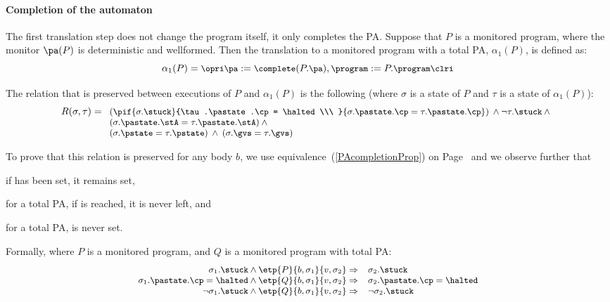 \paragraph{Completion of the automaton}
The first translation step does not change the program itself, it only
completes the PA. Suppose that \(P\) is a monitored program, where the
monitor \(\pa(P)\) is deterministic and wellformed. Then the
translation to a monitored program with a total PA, \(\alpha_1(P)\),
is defined as:
\[{\small
\alpha_1(P) = \opri \pa := \complete(P.\pa), \program := P.\program
\clri
}
\]

The relation that is preserved between executions of \(P\) and
\(\alpha_1(P)\) is the following (where \(\sigma\) is a state of
\(P\) and \(\tau\) is a state of \(\alpha_1(P)\)):
\[{\small
R(\sigma, \tau) =\\
 \begin{array}[t]{l}
  (\pif {\sigma.\stuck}{\tau.\pastate.\cp = \halted\\\ }
        {\sigma.\pastate.\cp = \tau.\pastate.\cp}) \:\wedge
  \neg \tau.\stuck \:\wedge\\
  (\sigma.\pastate.\stA = \tau.\pastate.\stA) \:\wedge\\
  (\sigma.\pstate = \tau.\pstate) \:\wedge\: (\sigma.\gvs = \tau.\gvs)
\end{array}}
\]

To prove that this relation is preserved for any body \(b\), we
use equivalence~(\ref{PAcompletionProp}) on
Page~\pageref{PAcompletionProp} and we observe further that
\begin{inparaenum}
\item if \stuck has been set, it remains set,
\item for a total PA, if  \halted is reached, it is never left, and
\item for a total PA, \stuck is never set.
\end{inparaenum} Formally, where \(P\) is a monitored program, and
\(Q\) is a monitored program with total PA:
\[{\small
\begin{array}[t]{rl}
\sigma_1.\stuck \wedge \etp{P}{b,\sigma_1}{v,\sigma_2} \Rightarrow &
\sigma_2.\stuck \\
\sigma_1.\pastate.\cp = \halted \wedge
\etp{Q}{b,\sigma_1}{v,\sigma_2} \Rightarrow &
\sigma_2.\pastate.\cp = \halted \\
\neg \sigma_1.\stuck \wedge \etp{Q}{b,\sigma_1}{v,\sigma_2} \Rightarrow &
\neg \sigma_2.\stuck
\end{array}}
\]

